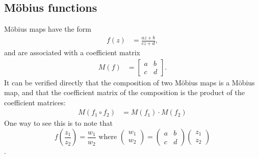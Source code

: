 \subsection{M\"obius functions}
\label{sec:moebiusdef}
M\"obius maps have the form
\begin{align}	f(z) &=  \frac{a z +b}{c z+ d},
\end{align}
and are associated with a coefficient matrix
\begin{align}
	M(f) &=
	\begin{bmatrix}
		a & b \\ c & d	\end{bmatrix}.
\end{align}
It can be verified directly that the composition of two M\"obius maps is a M\"obius map, and that the coefficient matrix of the composition is the product of the coefficient matrices:
\begin{align}
	M(f_1 \circ f_2) &= M(f_1 ) \cdot M( f_2)
\end{align}
One way to see this is to note that 
\begin{equation}
	f\left(\frac{z_1}{z_2}\right) =\frac{w_1}{w_2}  \mbox{ where } 	\begin{pmatrix}
		w_1 \\ w_2 
	\end{pmatrix} = 
	\begin{pmatrix}
		a & b \\ c & d
	\end{pmatrix} 
	\begin{pmatrix}
		z_1 \\ z_2
	\end{pmatrix}
\end{equation}.

